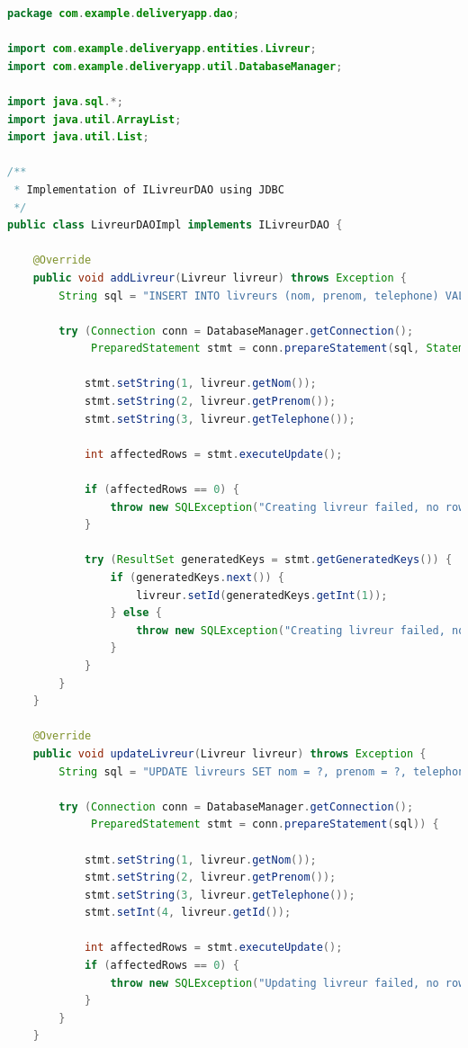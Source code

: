 \documentclass{rapportENSIAS}
\begin{document}
\begin{lstlisting}[language=Java, caption=Impl\'{e}mentation LivreurDAOImpl compl\`{e}te]
package com.example.deliveryapp.dao;

import com.example.deliveryapp.entities.Livreur;
import com.example.deliveryapp.util.DatabaseManager;

import java.sql.*;
import java.util.ArrayList;
import java.util.List;

/**
 * Implementation of ILivreurDAO using JDBC
 */
public class LivreurDAOImpl implements ILivreurDAO {

    @Override
    public void addLivreur(Livreur livreur) throws Exception {
        String sql = "INSERT INTO livreurs (nom, prenom, telephone) VALUES (?, ?, ?)";
        
        try (Connection conn = DatabaseManager.getConnection();
             PreparedStatement stmt = conn.prepareStatement(sql, Statement.RETURN_GENERATED_KEYS)) {
            
            stmt.setString(1, livreur.getNom());
            stmt.setString(2, livreur.getPrenom());
            stmt.setString(3, livreur.getTelephone());
            
            int affectedRows = stmt.executeUpdate();
            
            if (affectedRows == 0) {
                throw new SQLException("Creating livreur failed, no rows affected.");
            }
            
            try (ResultSet generatedKeys = stmt.getGeneratedKeys()) {
                if (generatedKeys.next()) {
                    livreur.setId(generatedKeys.getInt(1));
                } else {
                    throw new SQLException("Creating livreur failed, no ID obtained.");
                }
            }
        }
    }

    @Override
    public void updateLivreur(Livreur livreur) throws Exception {
        String sql = "UPDATE livreurs SET nom = ?, prenom = ?, telephone = ? WHERE id = ?";
        
        try (Connection conn = DatabaseManager.getConnection();
             PreparedStatement stmt = conn.prepareStatement(sql)) {
            
            stmt.setString(1, livreur.getNom());
            stmt.setString(2, livreur.getPrenom());
            stmt.setString(3, livreur.getTelephone());
            stmt.setInt(4, livreur.getId());
            
            int affectedRows = stmt.executeUpdate();
            if (affectedRows == 0) {
                throw new SQLException("Updating livreur failed, no rows affected.");
            }
        }
    }


\end{lstlisting}
\end{document}
